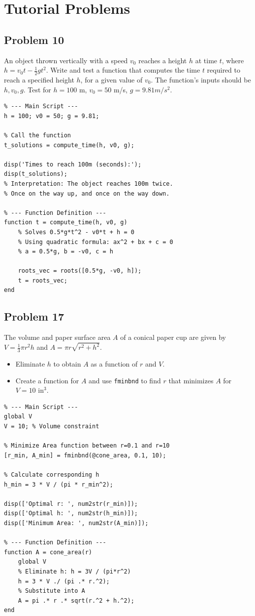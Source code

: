 \documentclass[DIN, pagenumber=false, fontsize=11pt, parskip=half]{scrartcl}
\newcommand{\myproblem}[1]{\subsection*{#1}}
\begin{document}
\section*{Tutorial Problems}

\myproblem{Problem 10}
An object thrown vertically with a speed $v_0$ reaches a height $h$ at time $t$, where $h=v_{0}t-\frac{1}{2}gt^{2}$. Write and test a function that computes the time $t$ required to reach a specified height $h$, for a given value of $v_0$. The function's inputs should be $h, v_0, g$. Test for $h=100$ m, $v_{0}=50$ m/s, $g=9.81 m/s^2$.

\begin{lstlisting}
% --- Main Script ---
h = 100; v0 = 50; g = 9.81;

% Call the function
t_solutions = compute_time(h, v0, g);

disp('Times to reach 100m (seconds):');
disp(t_solutions);
% Interpretation: The object reaches 100m twice.
% Once on the way up, and once on the way down.

% --- Function Definition ---
function t = compute_time(h, v0, g)
    % Solves 0.5*g*t^2 - v0*t + h = 0
    % Using quadratic formula: ax^2 + bx + c = 0
    % a = 0.5*g, b = -v0, c = h
    
    roots_vec = roots([0.5*g, -v0, h]);
    t = roots_vec;
end
\end{lstlisting}

\myproblem{Problem 17}
The volume and paper surface area $A$ of a conical paper cup are given by $V=\frac{1}{3}\pi r^{2}h$ and $A=\pi r\sqrt{r^{2}+h^{2}}$.
\begin{itemize}
    \item[a.] Eliminate $h$ to obtain $A$ as a function of $r$ and $V$.
    \item[b.] Create a function for $A$ and use \texttt{fminbnd} to find $r$ that minimizes $A$ for $V=10$ in$^3$.
\end{itemize}

\begin{lstlisting}
% --- Main Script ---
global V
V = 10; % Volume constraint

% Minimize Area function between r=0.1 and r=10
[r_min, A_min] = fminbnd(@cone_area, 0.1, 10);

% Calculate corresponding h
h_min = 3 * V / (pi * r_min^2);

disp(['Optimal r: ', num2str(r_min)]);
disp(['Optimal h: ', num2str(h_min)]);
disp(['Minimum Area: ', num2str(A_min)]);

% --- Function Definition ---
function A = cone_area(r)
    global V
    % Eliminate h: h = 3V / (pi*r^2)
    h = 3 * V ./ (pi .* r.^2);
    % Substitute into A
    A = pi .* r .* sqrt(r.^2 + h.^2);
end
\end{lstlisting}
\end{document}
